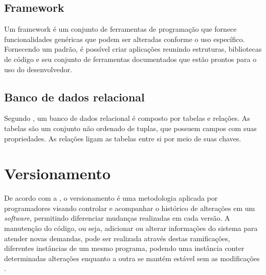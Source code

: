 \subsection{Framework}
Um framework é um conjunto de ferramentas de programação que fornece funcionalidades genéricas que podem ser alteradas conforme o uso específico. Fornecendo um padrão, é possível criar aplicações reunindo estruturas, bibliotecas de código e seu conjunto de ferramentas documentados que estão prontos para o uso do desenvolvedor.

\subsection{Banco de dados relacional}
Segundo , um banco de dados relacional é composto por tabelas e relações. As tabelas são um conjunto não ordenado de tuplas, que possuem campos com suas propriedades. As relações ligam as tabelas entre si por meio de suas chaves.

\section{Versionamento}
De acordo com a , o versionamento é uma metodologia aplicada por programadores visando controlar e acompanhar o histórico de alterações em um \textit{software}, permitindo diferenciar mudanças realizadas em cada versão. A manutenção do código, ou seja, adicionar ou alterar informações do sistema para atender novas demandas, pode ser realizada através destas ramificações, diferentes instâncias de um mesmo programa, podendo uma instância conter determinadas alterações enquanto a outra se mantém estável sem as modificações \cite{SOMOSTERA}.